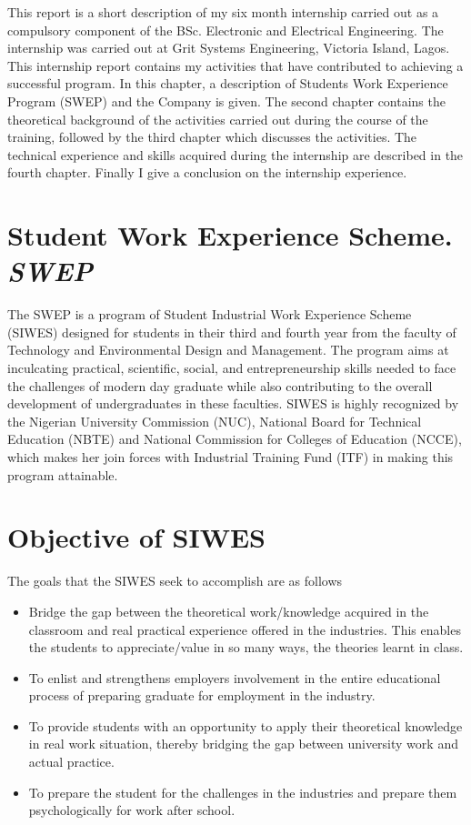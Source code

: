 This report is a short description of my six month internship carried out as a
compulsory component of the BSc. Electronic and Electrical Engineering. The
internship was carried out at Grit Systems Engineering, Victoria Island, Lagos.
This internship report contains my activities that have contributed to achieving a
successful program. In this chapter, a description of Students Work Experience
Program (SWEP) and the Company is given. The second chapter contains the
theoretical background of the activities carried out during the course of the training,
followed by the third chapter which discusses the activities. The technical experience
and skills acquired during the internship are described in the fourth chapter. Finally I
give a conclusion on the internship experience.

\section[SWEP]{Student Work Experience Scheme. \textit{SWEP}}

The SWEP is a program of Student Industrial Work Experience Scheme (SIWES)
designed for students in their third and fourth year from the faculty of Technology and
Environmental Design and Management. The program aims at inculcating practical,
scientific, social, and entrepreneurship skills needed to face the challenges of modern
day graduate while also contributing to the overall development of undergraduates in
these faculties. SIWES is highly recognized by the Nigerian University Commission
(NUC), National Board for Technical Education (NBTE) and National Commission
for Colleges of Education (NCCE), which makes her join forces with Industrial
Training Fund (ITF) in making this program attainable.

\section{Objective of SIWES} 

The goals that the SIWES seek to accomplish are as follows
\begin{itemize}
\item Bridge the gap between the theoretical work/knowledge acquired in the
classroom and real practical experience offered in the industries. This enables
the students to appreciate/value in so many ways, the theories learnt in class.
\item To enlist and strengthens employers involvement in the entire educational
process of preparing graduate for employment in the industry.
\item To provide students with an opportunity to apply their theoretical knowledge
in real work situation, thereby bridging the gap between university work and
actual practice.
\item To prepare the student for the challenges in the industries and prepare them
psychologically for work after school.
\end{itemize}

